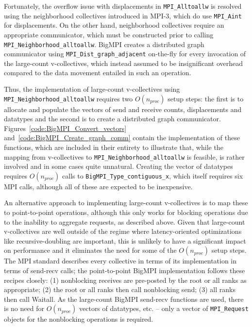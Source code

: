 Fortunately, the overflow issue with displacements in \texttt{MPI\_Alltoallw} is
resolved using the neighborhood collectives introduced in MPI-3, which do
use \texttt{MPI\_Aint} for displacements.
On the other hand, neighborhood collectives require an appropriate
communicator, which must be constructed prior to calling \texttt{MPI\_Neighborhood\_alltoallw}.
BigMPI creates a distributed graph communicator using \texttt{MPI\_Dist\_graph\_adjacent}
on-the-fly for every invocation of the large-count v-collectives, which instead assumed to be
insignificant overhead compared to the data movement entailed in such an operation.

Thus, the implementation of large-count v-collectives using \texttt{MPI\_Neighborhood\_alltoallw} 
requires two $O(n_{proc})$ setup steps: the first is to allocate and populate the vectors of 
send and receive counts, displacements and datatypes and 
the second is to create a distributed graph communicator.
Figures~\ref{code:BigMPI_Convert_vectors} and~\ref{code:BigMPI_Create_graph_comm}
contain the implementation of these functions, which are included in their entirety to illustrate that,
while the mapping from v-collectives to \texttt{MPI\_Neighborhood\_alltoallw} is feasible,
is rather involved and in some cases quite unnatural.
Creating the vector of datatypes requires $O(n_{proc})$ calls to \texttt{BigMPI\_Type\_contiguous\_x},
which itself requires six MPI calls, although all of these are expected to be inexpensive.


An alternative approach to implementing large-count v-collectives is to map
these to point-to-point operations, although this only works for blocking operations
due to the inability to aggregate requests, as described above.
Given that large-count v-collectives are well outside of the regime where latency-oriented 
optimizations like recursive-doubling are important, this is unlikely to have a significant impact 
on performance and it eliminates the need for some of the $O(n_{proc})$ setup steps.
The MPI standard describes every collective in terms of its implementation 
in terms of send-recv calls; the point-to-point BigMPI implementation 
follows these recipes closely:
(1) nonblocking receives are pre-posted by the root or all ranks as appropriate;
(2) the root or all ranks then call nonblocking send; 
(3) all ranks then call Waitall.
As the large-count BigMPI send-recv functions are used, there is no need for
$O(n_{proc})$ vectors of datatypes, etc. -- only a vector of \texttt{MPI\_Request}
objects for the nonblocking operations is required.

